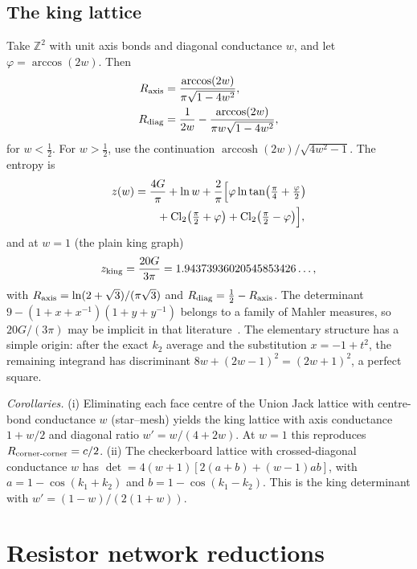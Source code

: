 \documentclass[aps,pre,10pt,twocolumn,superscriptaddress,nofootinbib]{revtex4-2}
\newcommand{\Cl}{\operatorname{Cl}_2}
\newcommand{\sq}{\sqrt{3}}
\newcommand{\arccosh}{\operatorname{arccosh}}
\begin{document}
\subsection{The king lattice}

Take $\mathbb{Z}^2$ with unit axis bonds and diagonal conductance $w$, and let $\varphi=\arccos(2w)$. Then
\begin{align}
R_{\rm axis}&=\frac{\arccos(2w)}{\pi\sqrt{1-4w^2}},\\
R_{\rm diag}&=\frac1{2w}-\frac{\arccos(2w)}{\pi w\sqrt{1-4w^2}},
\end{align}
for $w<\tfrac12$. For $w>\tfrac12$, use the continuation $\arccosh(2w)/\sqrt{4w^2-1}$. The entropy is
\begin{align}
z(w)&=\frac{4G}\pi+\ln w+\frac2\pi\Bigl[\varphi\ln\tan\bigl(\tfrac\pi4+\tfrac\varphi2\bigr)\nonumber\\
&\qquad+\Cl\bigl(\tfrac\pi2+\varphi\bigr)+\Cl\bigl(\tfrac\pi2-\varphi\bigr)\Bigr],
\end{align}
and at $w=1$ (the plain king graph)
\begin{equation}
z_{\rm king}=\frac{20G}{3\pi}=1.94373936020545853426\ldots,
\end{equation}
with $R_{\rm axis}=\ln(2+\sq)/(\pi\sq)$ and $R_{\rm diag}=\tfrac12-R_{\rm axis}$. The determinant
$9-(1+x+x^{-1})(1+y+y^{-1})$ belongs to a family of Mahler measures, so $20G/(3\pi)$ may be implicit
in that literature~\cite{GuttmannRogers2012}. The elementary structure has a simple origin: after
the exact $k_2$ average and the substitution $x=-1+t^2$, the remaining integrand has discriminant
$8w+(2w-1)^2=(2w+1)^2$, a perfect square.

\emph{Corollaries.} (i) Eliminating each face centre of the Union Jack lattice with centre-bond
conductance $w$ (star--mesh) yields the king lattice with axis conductance $1+w/2$ and diagonal
ratio $w'=w/(4+2w)$. At $w=1$ this reproduces $R_{\rm corner\text{-}corner}=c/2$.
(ii) The checkerboard lattice with crossed-diagonal conductance $w$ has
$\det=4(w+1)[2(a+b)+(w-1)ab]$, with $a=1-\cos(k_1+k_2)$ and $b=1-\cos(k_1-k_2)$. This is the king
determinant with $w'=(1-w)/(2(1+w))$.

\section{Resistor network reductions}
\label{sec:res}
\end{document}
